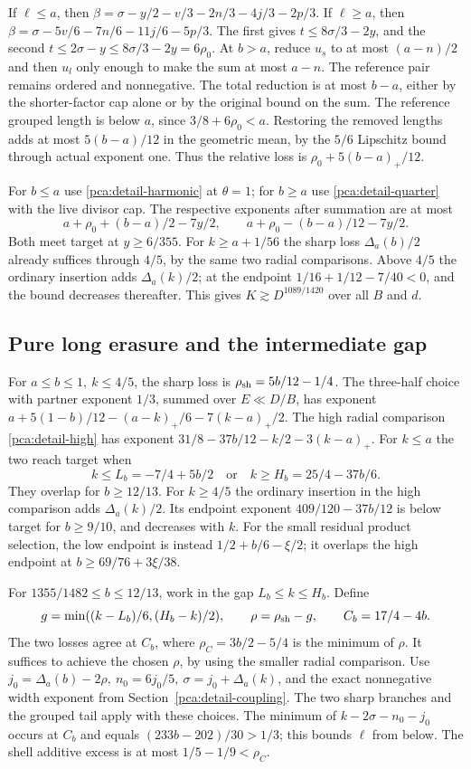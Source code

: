 If \(\ell\le a\), then
\(\beta=\sigma-y/2-v/3-2n/3-4j/3-2p/3\).
If \(\ell\ge a\), then
\(\beta=\sigma-5v/6-7n/6-11j/6-5p/3\).
The first gives \(t\le8\sigma/3-2y\), and the second
\(t\le2\sigma-y\le8\sigma/3-2y=6\rho_0\).
At \(b>a\), reduce \(u_s\) to at most \((a-n)/2\) and
then \(u_l\) only enough to make the sum at most \(a-n\).
The reference pair remains ordered and nonnegative.
The total reduction is at most \(b-a\), either by the
shorter-factor cap alone or by the original bound on the sum.
The reference grouped length is below \(a\), since
\(3/8+6\rho_0<a\). Restoring the removed lengths adds at
most \(5(b-a)/12\) in the geometric mean, by the \(5/6\)
Lipschitz bound through actual exponent one.
Thus the relative loss is
\(\rho_0+5(b-a)_+/12\).

For \(b\le a\) use \eqref{pca:detail-harmonic} at \(\theta=1\);
for \(b\ge a\) use \eqref{pca:detail-quarter} with the
live divisor cap. The respective exponents after summation
are at most
\[
 a+\rho_0+(b-a)/2-7y/2,\qquad
 a+\rho_0-(b-a)/12-7y/2 .
\]
Both meet target at \(y\ge6/355\).
For \(k\ge a+1/56\) the sharp loss \(\Delta_a(b)/2\)
already suffices through \(4/5\), by the same two radial
comparisons. Above \(4/5\) the ordinary insertion adds
\(\Delta_a(k)/2\); at the endpoint
\(1/16+1/12-7/40<0\), and the bound decreases thereafter.
This gives \(K\gtrsim D^{1089/1420}\) over all \(B\) and \(d\).

\subsection{Pure long erasure and the intermediate gap}
\label{pca:detail-gap}

For \(a\le b\le1,\ k\le4/5\), the sharp loss is
\(\rho_{\rm sh}=5b/12-1/4\).
The three-half choice with partner exponent \(1/3\), summed
over \(E\ll D/B\), has exponent
\(a+5(1-b)/12-(a-k)_+/6-7(k-a)_+/2\).
The high radial comparison \eqref{pca:detail-high} has exponent
\(31/8-37b/12-k/2-3(k-a)_+\).
For \(k\le a\) the two reach target when
\[
 k\le L_b=-7/4+5b/2\quad\text{or}\quad
 k\ge H_b=25/4-37b/6 .
\]
They overlap for \(b\ge12/13\). For \(k\ge4/5\) the
ordinary insertion in the high comparison adds \(\Delta_a(k)/2\).
Its endpoint exponent \(409/120-37b/12\) is below target for
\(b\ge9/10\), and decreases with \(k\).
For the small residual product selection, the low endpoint
is instead \(1/2+b/6-\xi/2\); it overlaps the high endpoint
at \(b\ge69/76+3\xi/38\).

For \(1355/1482\le b\le12/13\), work in the gap
\(L_b\le k\le H_b\). Define
\[
 g=\min((k-L_b)/6,(H_b-k)/2),\qquad
 \rho=\rho_{\rm sh}-g,\qquad C_b=17/4-4b .
\]
The two losses agree at \(C_b\), where
\(\rho_C=3b/2-5/4\) is the minimum of \(\rho\).
It suffices to achieve the chosen \(\rho\), by using the
smaller radial comparison. Use
\(j_0=\Delta_a(b)-2\rho,\ n_0=6j_0/5,\ \sigma=j_0+\Delta_a(k)\),
and the exact nonnegative width exponent from
Section~\ref{pca:detail-coupling}. The two sharp branches and
the grouped tail apply with these choices. The minimum of
\(k-2\sigma-n_0-j_0\) occurs at \(C_b\) and equals
\((233b-202)/30>1/3\); this bounds \(\ell\) from below.
The shell additive excess is at most \(1/5-1/9<\rho_C\).

